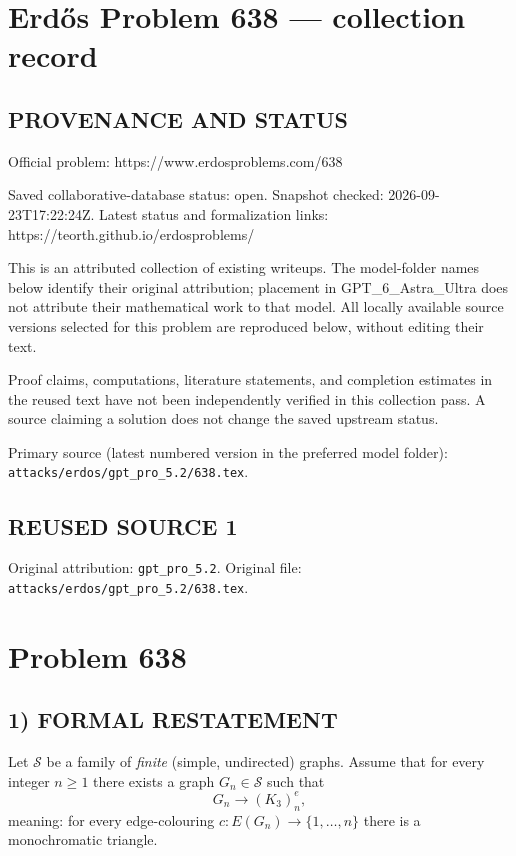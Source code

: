 \section*{Erd\H{o}s Problem 638 --- collection record}

\subsection*{PROVENANCE AND STATUS}
Official problem: https://www.erdosproblems.com/638

Saved collaborative-database status: open.
Snapshot checked: 2026-09-23T17:22:24Z.
Latest status and formalization links: https://teorth.github.io/erdosproblems/

This is an attributed collection of existing writeups. The model-folder names below identify their original attribution; placement in GPT\_6\_Astra\_Ultra does not attribute their mathematical work to that model. All locally available source versions selected for this problem are reproduced below, without editing their text.

Proof claims, computations, literature statements, and completion estimates in the reused text have not been independently verified in this collection pass. A source claiming a solution does not change the saved upstream status.

Primary source (latest numbered version in the preferred model folder): \texttt{attacks/erdos/gpt\_pro\_5.2/638.tex}.

\subsection*{REUSED SOURCE 1}
Original attribution: \texttt{gpt\_pro\_5.2}.
Original file: \texttt{attacks/erdos/gpt\_pro\_5.2/638.tex}.

\section*{Problem 638}

\subsection*{1) FORMAL RESTATEMENT}
Let $\mathcal S$ be a family of \emph{finite} (simple, undirected) graphs.
Assume that for every integer $n\ge 1$ there exists a graph $G_n\in\mathcal S$ such that
\[
  G_n \to (K_3)^{e}_n,
\]
meaning: for every edge-colouring $c:E(G_n)\to\{1,\dots,n\}$ there is a monochromatic triangle.

